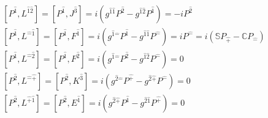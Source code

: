 \documentclass[]{article}
\numberwithin{equation}{section}
\begin{document}
\begin{align}
    &\left[P^{\hat{1}},L^{\hat{1}\hat{2}}\right]=\left[P^{\hat{1}},J^\hat{3}\right]=i\left(g^{\hat{1}\hat{1}}P^{\hat{2}}-g^{\hat{1}\hat{2}}P^{\hat{1}}\right)=-iP^{\hat{2}}\\
    &\left[P^{\hat{1}},L^{\hat{-}\hat{1}}\right]=\left[P^{\hat{1}},F^\hat{1}\right]=i\left(g^{\hat{1}\hat{-}}P^{\hat{1}}-g^{\hat{1}\hat{1}}P^{\hat{-}}\right)=iP^{\hat{-}}=i\left(\mathbb{S}P_{\hat{+}}-\mathbb{C}P_{\hat{-}}\right)\\
    &\left[P^{\hat{1}},L^{\hat{-}\hat{2}}\right]=\left[P^{\hat{1}},F^\hat{2}\right]=i\left(g^{\hat{1}\hat{-}}P^{\hat{2}}-g^{\hat{1}\hat{2}}P^{\hat{-}}\right)=0\\
    &\left[P^{\hat{2}},L^{\hat{-}\hat{+}}\right]=\left[P^{\hat{2}},K^\hat{3}\right]=i\left(g^{\hat{2}\hat{-}}P^{\hat{+}}-g^{\hat{2}\hat{+}}P^{\hat{-}}\right)=0\\
    &\left[P^{\hat{2}},L^{\hat{+}\hat{1}}\right]=\left[P^{\hat{2}},E^\hat{1}\right]=i\left(g^{\hat{2}\hat{+}}P^{\hat{1}}-g^{\hat{2}\hat{1}}P^{\hat{+}}\right)=0
    \end{align}
\end{document}

